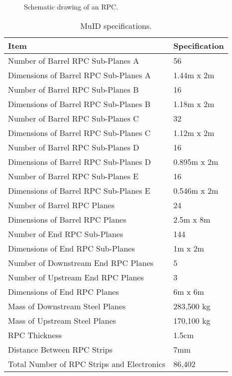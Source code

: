 \begin{figure}[htp]
\begin{center}
\caption{\label{FGT_RPC} Schematic drawing of an RPC.} 
\end{center}
\end{figure}

\begin{table}
\centering
  \caption{\label{MID_specs} MuID specifications.}
  \begin{tabular}{| l | l |}
    \hline
Item&Specification \\
    \hline
Number of Barrel RPC Sub-Planes A & 56 \\
Dimensions of Barrel RPC Sub-Planes A &  1.44m x 2m \\
Number of Barrel RPC Sub-Planes B & 16 \\
Dimensions of Barrel RPC Sub-Planes B &  1.18m x 2m \\
Number of Barrel RPC Sub-Planes C & 32 \\
Dimensions of Barrel RPC Sub-Planes C &  1.12m x 2m \\
Number of Barrel RPC Sub-Planes D & 16 \\
Dimensions of Barrel RPC Sub-Planes D &  0.895m x 2m \\
Number of Barrel RPC Sub-Planes E & 16 \\
Dimensions of Barrel RPC Sub-Planes E &  0.546m x 2m \\
Number of Barrel RPC Planes & 24 \\
Dimensions of Barrel RPC Planes & 2.5m x 8m \\
Number of End RPC Sub-Planes & 144 \\
Dimensions of End RPC Sub-Planes & 1m x 2m \\
Number of Downstream End RPC Planes & 5 \\
Number of Upstream End RPC Planes & 3 \\
Dimensions of End RPC Planes & 6m x 6m \\
Mass of Downstream Steel Planes & 283,500 kg \\
Mass of Upstream Steel Planes & 170,100 kg \\
RPC Thickness & 1.5cm \\
Distance Between RPC Strips & 7mm \\
Total Number of RPC Strips and Electronics & 86,402 \\
     \hline
  \end{tabular}
\end{table}

